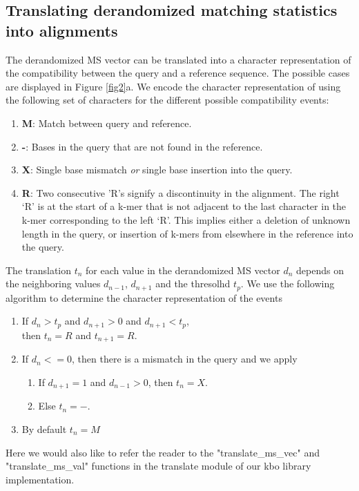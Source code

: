 \documentclass[unnumsec,webpdf,contemporary,large]{oup-authoring-template}%
\theoremstyle{thmstyleone}%
\theoremstyle{thmstyletwo}%
\theoremstyle{thmstylethree}%
\begin{document}
\subsection{Translating derandomized matching statistics into alignments}

\begin{figure*}[!t]%
\centering
{}
\caption{\textbf{Draft Applying the translation procedure to a derandomized matching statistics vector.}. Panel a) shows the result of translating a single position at a time. Panel b) shows the result of translating an entire vector with multiple cases. Examples in both panels assume \emph{k}-mer size 3 and derandomization threshold 2.}\label{fig2}
\end{figure*}

The derandomized MS vector can be translated into a character representation of the compatibility between the query and a reference sequence. The possible cases are displayed in Figure \ref{fig2}a. We encode the character representation of using the following set of characters for the different possible compatibility events:
\begin{enumerate}
\item[] \textbf{M}: Match between query and reference.
\item[] \textbf{-}: Bases in the query that are not found in the reference.
\item[] \textbf{X}: Single base mismatch \textit{or} single base insertion into the query.
\item[] \textbf{R}: Two consecutive ’R’s signify a discontinuity in the alignment. The right ‘R’ is at the start of a k-mer that is not adjacent to the last character in the k-mer corresponding to the left ‘R’. This implies either a deletion of unknown length in the query, or insertion of k-mers from elsewhere in the reference into the query.
\end{enumerate}

The translation $t_n$ for each value in the derandomized MS vector $d_n$ depends on the neighboring values $d_{n - 1}$, $d_{n + 1}$ and the thresolhd $t_p$. We use the following algorithm to determine the character representation of the events
\begin{enumerate}
\item If $d_n > t_p$ and $d_{n + 1} > 0$ and $d_{n + 1} < t_p$, \\ then $t_n = R$ and $t_{n + 1} = R$.
\item If $d_n <= 0$, then there is a mismatch in the query and we apply
    \begin{enumerate}
    \item If $d_{n + 1} = 1$ and $d_{n - 1} > 0$, then $t_n = X$.
    \item Else $t_n = -$.
    \end{enumerate}
\item By default $t_n = M$
\end{enumerate}
Here we would also like to refer the reader to the "translate\_ms\_vec" and "translate\_ms\_val" functions in the translate module of our kbo library implementation.
\end{document}
